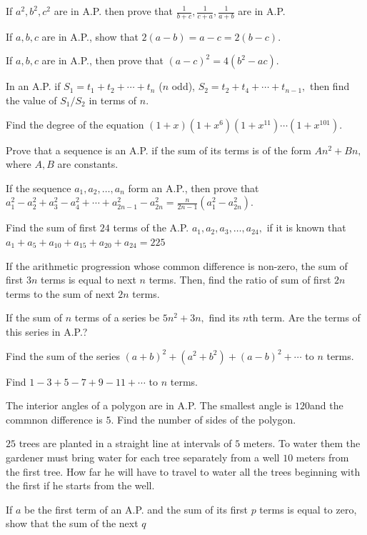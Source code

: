 \item If $a^2, b^2, c^2$ are in A.P. then prove that $\frac{1}{b+c}, \frac{1}{c+a}, \frac{1}{a + b}$ are in A.P.
\item If $a, b, c$ are in A.P., show that $2(a - b) = a - c = 2(b - c)$.
\item If $a, b , c$ are in A.P., then prove that $(a - c)^2 = 4(b^2 - ac)$.
\item In an A.P. if $S_1 = t_1 + t_2 + \cdots + t_n$ ($n$ odd), $S_2 = t_2 + t_4 + \cdots + t_{n - 1},$ then find the value of
  $S_1/S_2$ in terms of $n$.
\item Find the degree of the equation $(1 + x)(1 + x^6)(1 + x^{11})\cdots (1+ x^{101})$.
\item Prove that a sequence is an A.P. if the sum of its terms is of the form $An^2 + Bn,$ where $A, B$ are constants.
\item If the sequence $a_1, a_2, \ldots, a_n$ form an A.P., then prove that $a_1^2 - a_2^2 + a_3^2 - a_4^2 + \cdots + a_{2n - 1}^2
  - a_{2n}^2 = \frac{n}{2n - 1}(a_1^2 - a_{2n}^2)$.
\item Find the sum of first $24$ terms of the A.P. $a_1, a_2, a_3, \ldots, a_{24},$ if it is known that $a_1 + a_5 + a_{10} +
  a_{15} + a_{20} + a_{24} = 225$
\item If the arithmetic progression whose common difference is non-zero, the sum of first $3n$ terms is equal to next $n$
  terms. Then, find the ratio of sum of first $2n$ terms to the sum of next $2n$ terms.
\item If the sum of $n$ terms of a series be $5n^2 + 3n,$ find its $n$th term. Are the terms of this series in A.P.?
\item Find the sum of the series $(a + b)^2 + (a^2 + b^2) + (a - b)^2 + \cdots$ to $n$ terms.
\item Find $1 - 3 + 5 - 7 + 9 - 11 + \cdots$ to $n$ terms.
\item The interior angles of a polygon are in A.P. The smallest angle is $120$\textdegree and the commnon difference is
  $5$\textdegree. Find the number of sides of the polygon.
\item $25$ trees are planted in a straight line at intervals of $5$ meters. To water them the gardener must bring water for each
  tree separately from a well $10$ meters from the first tree. How far he will have to travel to water all the trees beginning with
  the first if he starts from the well.
\item If $a$ be the first term of an A.P. and the sum of its first $p$ terms is equal to zero, show that the sum of the next $q$
